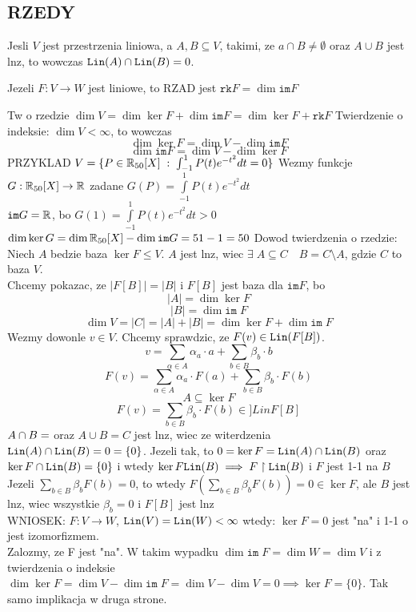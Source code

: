 \documentclass{article}
\begin{document}
\subsection*{RZEDY}
Jesli $V$ jest przestrzenia liniowa, a $A, B\subseteq V$, takimi, ze $a\cap B\neq \emptyset$ oraz $A\cup B$ jest lnz, to wowczas $\texttt{Lin}(A)\cap\texttt{Lin}(B)=0$.
    \begin{center}
        Jezeli $F:V\to W$ jest liniowe, to RZAD jest $\texttt{rk}F=\dim\texttt{im}F$
    \end{center}
    Tw o rzedzie $\dim V=\dim \ker F+\dim\texttt{im}F=\dim\ker F+\texttt{rk}F$
    Twierdzenie o indeksie: $\dim V<\infty$, to wowczas
    $$\dim \ker F=\dim V-\dim\texttt{im}F$$
    $$\dim \texttt{im}F=\dim V-\dim \ker F$$
    PRZYKLAD $V=\{P\in\mathbb{R}_{50}[X]\;:\;\int_{-1}^1P(t)e^{-t^2}dt=0\}$
    Wezmy funkcje $G:\mathbb{R}_{50}[X]\to\mathbb{R}$ zadane $G(P)=\int\limits_{-1}^1P(t)e^{-t^2}dt$\\
    $\texttt{im}G=\mathbb{R}$, bo $G(1)=\int\limits_{-1}^1P(t)e^{-t^2}dt>0$
    $\dim\ker G=\dim \mathbb{R}_{50}[X]-\dim\texttt{im}G=51-1=50$
    Dowod twierdzenia o rzedzie:\\
    Niech $A$ bedzie baza $\ker F\leq V$. $A$ jest lnz, wiec $\exists\;A\subseteq C\quad B=C\setminus A$, gdzie $C$ to baza $V$.\\
    Chcemy pokazac, ze $|F[B]|=|B|$ i $F[B]$ jest baza dla $\texttt{im}F$, bo 
    $$|A|=\dim\ker F$$
    $$|B|=\dim \texttt{im}\;F$$
    $$\dim V=|C|=|A|+|B|=\dim\ker F+\dim\texttt{im}\;F$$
    Wezmy dowonle $v\in V$. Chcemy sprawdzic, ze $F(v)\in\texttt{Lin}(F[B])$.
    $$v=\sum\limits_{\alpha\in A}\alpha_a\cdot a+\sum\limits_{b\in B}\beta_b\cdot b$$
    $$F(v)=\sum\limits_{\alpha\in A}\alpha_a\cdot F(a)+\sum\limits_{b\in B}\beta_b\cdot F(b)$$
    $$A\subseteq\ker F$$
    $$F(v)=\sum\limits_{b\in B}\beta_b\cdot F(b)\in]Lin{F[B]}$$
    $A\cap B=\empty$ oraz $A\cup B=C$ jest lnz, wiec ze witerdzenia $\texttt{Lin}(A)\cap\texttt{Lin}(B)=0=\{0\}$. Jezeli tak, to $0=\ker F=\texttt{Lin}(A)\cap\texttt{Lin}(B)$ oraz $\ker F\cap \texttt{Lin}(B)=\{0\}$ i wtedy $\ker F\texttt{Lin}(B)\implies F\upharpoonright\texttt{Lin}(B)$ i $F$ jest 1-1 na $B$
    Jezeli $\sum\limits_{b\in B}\beta_bF(b)=0$, to wtedy $F(\sum\limits_{b\in B}\beta_bF(b))=0\in\ker F$, ale $B$ jest lnz, wiec wszystkie $\beta_b=0$ i $F[B]$ jest lnz \\
    WNIOSEK: $F:V\to W$, $\texttt{Lin}(V)=\texttt{Lin}(W)<\infty$ wtedy: $\ker F=0$ jest "na" i 1-1 o jest izomorfizmem.\\
    Zalozmy, ze F jest "na". W takim wypadku $\dim\texttt{im}\;F=\dim W=\dim V$ i z twierdzenia o indeksie $\dim\ker F=\dim V-\dim \texttt{im}\;F=\dim V-\dim V=0\implies \ker F=\{0\}$. Tak samo implikacja w druga strone.\\
\end{document}
